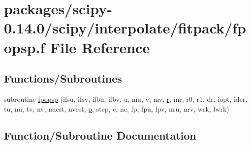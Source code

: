 \hypertarget{fpopsp_8f}{}\section{packages/scipy-\/0.14.0/scipy/interpolate/fitpack/fpopsp.f File Reference}
\label{fpopsp_8f}
\subsection*{Functions/\+Subroutines}
\begin{DoxyCompactItemize}
\item 
subroutine \hyperlink{fpopsp_8f_a3109527fef09abad99278326700c00b7}{fpopsp} (ifsu, ifsv, ifbu, ifbv, u, mu, v, mv, \hyperlink{indexexpr_8h_ac434fd11cc2493608d8d91424d60c17e}{r}, mr, r0, r1, dr, iopt, ider, tu, nu, tv, nv, nuest, nvest, \hyperlink{indexexpr_8h_a2b8c103eb5bfc196fbc3d29923e28ac1}{p}, step, c, nc, fp, fpu, fpv, nru, nrv, wrk, lwrk)
\end{DoxyCompactItemize}


\subsection{Function/\+Subroutine Documentation}
\hypertarget{fpopsp_8f_a3109527fef09abad99278326700c00b7}{}

